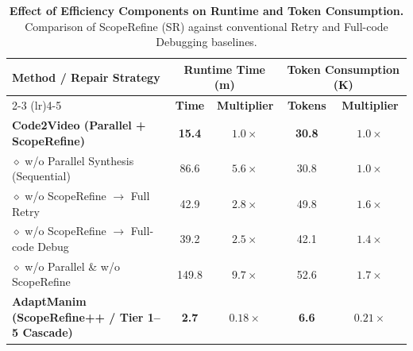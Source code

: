 \begin{table}[h]
\centering
\small
\caption{\textbf{Effect of Efficiency Components on Runtime and Token Consumption.} 
Comparison of ScopeRefine (SR) against conventional Retry and Full-code Debugging baselines.}
\label{tab:efficiency_ablation}
\begin{tabular}{lcccc}
\toprule
\textbf{Method / Repair Strategy} & \multicolumn{2}{c}{\textbf{Runtime Time (m)}} & \multicolumn{2}{c}{\textbf{Token Consumption (K)}} \\
\cmidrule(lr){2-3} \cmidrule(lr){4-5}
& \textbf{Time} & \textbf{Multiplier} & \textbf{Tokens} & \textbf{Multiplier} \\
\midrule
\textbf{Code2Video (Parallel + ScopeRefine)} & \textbf{15.4} & $1.0\times$ & \textbf{30.8} & $1.0\times$ \\
\quad $\diamond$ w/o Parallel Synthesis (Sequential) & 86.6 & $5.6\times$ & 30.8 & $1.0\times$ \\
\quad $\diamond$ w/o ScopeRefine $\to$ Full Retry & 42.9 & $2.8\times$ & 49.8 & $1.6\times$ \\
\quad $\diamond$ w/o ScopeRefine $\to$ Full-code Debug & 39.2 & $2.5\times$ & 42.1 & $1.4\times$ \\
\quad $\diamond$ w/o Parallel \& w/o ScopeRefine & 149.8 & $9.7\times$ & 52.6 & $1.7\times$ \\
\midrule
\textbf{AdaptManim (ScopeRefine++ / Tier 1--5 Cascade)} & \textbf{2.7} & $\mathbf{0.18\times}$ & \textbf{6.6} & $\mathbf{0.21\times}$ \\
\bottomrule
\end{tabular}
\end{table}